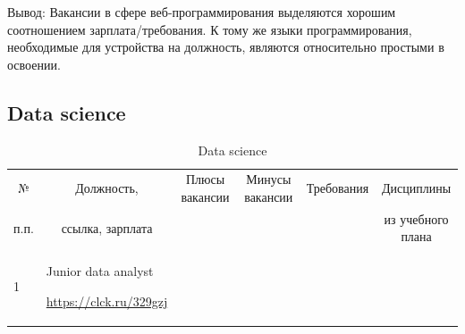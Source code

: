 \begin{landscape}
\begin{table}[H]
\begin{center}
\begin{small}
\begin{tabular}{|p{0.1cm}|p{5cm}|p{4.5cm}|p{4.5cm}|p{4cm}|p{3cm}|}
				
				
			\end{tabular}
		\end{small}
	\end{center}
\end{table}
Вывод: Вакансии в сфере веб-программирования выделяются хорошим соотношением зарплата/требования. К тому же языки программирования, необходимые для устройства на должность, являются относительно простыми в освоении.

\begin{table}[H]
	\subsection{Data science}\caption{Data science}
	\begin{center}
		\begin{small}
		\begin{tabular}{|p{0.1cm}|p{5cm}|p{4.5cm}|p{4.5cm}|p{4cm}|p{3cm}|} \hline
			\multicolumn{1}{|c|}{№}&\multicolumn{1}{c|}{Должность,}&\multicolumn{1}{c|}{Плюсы вакансии}&\multicolumn{1}{c|}{Минусы вакансии}&\multicolumn{1}{c|}{Требования}&\multicolumn{1}{c|}{Дисциплины}\\ 
			\multicolumn{1}{|c|}{п.п.}&\multicolumn{1}{c|}{ссылка, зарплата}&\multicolumn{1}{c|}{}&\multicolumn{1}{c|}{}&\multicolumn{1}{c|}{}&\multicolumn{1}{c|}{из учебного плана}\\ 
			\hline
				1 & Junior data analyst
				
				\url{https://clck.ru/329gzj}
				

\end{tabular}
\end{small}
\end{center}
\end{table}
\end{landscape}
